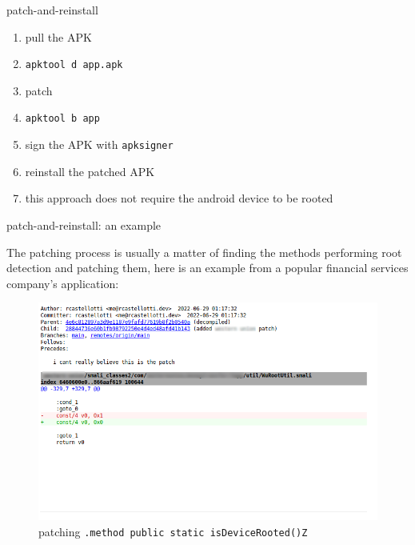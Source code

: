 \documentclass{beamer}
\begin{document}
\begin{frame}{patch-and-reinstall}

    \begin{enumerate}[]
        \item pull the APK
        \item {\footnotesize \texttt{apktool d app.apk}}
        \item patch
        \item {\footnotesize \texttt{apktool b app}}
        \item sign the APK with {\footnotesize \texttt{apksigner}}
        \item reinstall the patched APK
        \item this approach does not require the android device to be rooted
    \end{enumerate}

\end{frame}

\begin{frame}[fragile]{patch-and-reinstall: an example}

    The patching process is usually a matter of finding the methods performing root detection and patching them, here is an example from a popular financial services company's application:
    \begin{figure}
        \centering \includegraphics[scale=1.2]{patch.png}
        \caption{patching \texttt{.method public static isDeviceRooted()Z} }
    \end{figure}

\end{frame}
\end{document}
